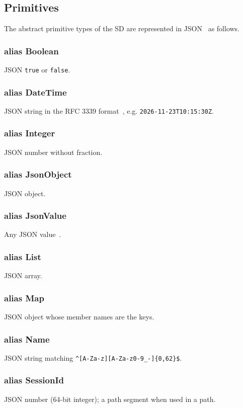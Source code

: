 \documentclass[a4paper]{arrowhead}
\newcommand{\pdef}[1]{{\textcolor{ArrowheadGrey}{#1\label{sec:model:primitives:#1}\label{sec:model:primitives:#1s}}}}
\begin{document}
\subsection{Primitives}
\label{sec:model:primitives}
The abstract primitive types of the SD are represented in JSON~\cite{rfc8259} as follows.
\subsubsection*{alias \pdef{Boolean}}
JSON \texttt{true} or \texttt{false}.

\subsubsection*{alias \pdef{DateTime}}
JSON string in the RFC 3339 format~\cite{rfc3339}, e.g. \texttt{2026-\allowbreak{}11-\allowbreak{}23T10:15:30Z}.

\subsubsection*{alias \pdef{Integer}}
JSON number without fraction.

\subsubsection*{alias \pdef{JsonObject}}
JSON object.

\subsubsection*{alias \pdef{JsonValue}}
Any JSON value~\cite{rfc8259}.

\subsubsection*{alias \pdef{List}}
JSON array.

\subsubsection*{alias \pdef{Map}}
JSON object whose member names are the keys.

\subsubsection*{alias \pdef{Name}}
JSON string matching \texttt{\^{}[A-Za-z][A-Za-z0-9\_-]\{0,62\}\$}.

\subsubsection*{alias \pdef{SessionId}}
JSON number (64-bit integer); a path segment when used in a path.
\end{document}

